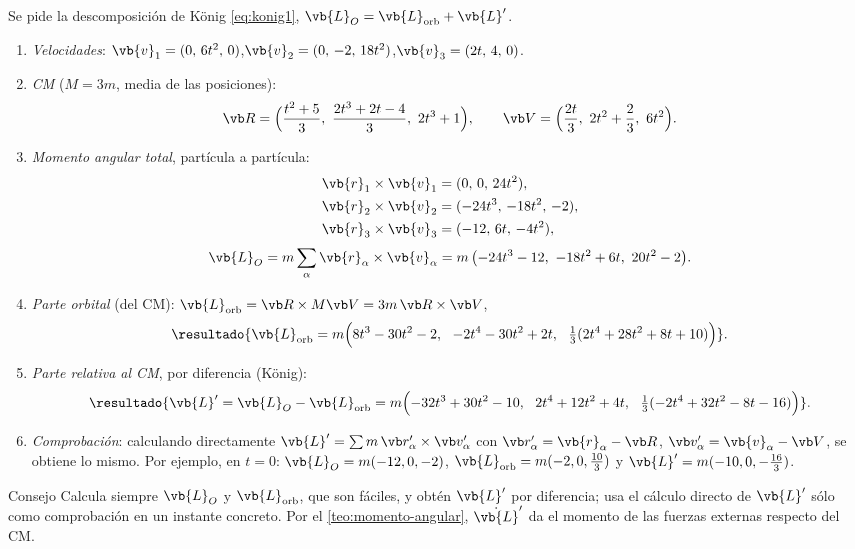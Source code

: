 \begin{resolucion}
Se pide la descomposición de König \eqref{eq:konig1},
$\vb{L}_{O}=\vb{L}_{\text{orb}}+\vb{L}'$.
\begin{enumerate}
  \item \emph{Velocidades}:
  $\vb{v}_{1}=(0,\,6t^{2},\,0)$,\quad $\vb{v}_{2}=(0,\,-2,\,18t^{2})$,\quad $\vb{v}_{3}=(2t,\,4,\,0)$.
  \item \emph{CM} ($M=3m$, media de las posiciones):
  \[
    \Rc=\Bigl(\frac{t^{2}+5}{3},\ \frac{2t^{3}+2t-4}{3},\ 2t^{3}+1\Bigr),\qquad
    \Vc=\Bigl(\frac{2t}{3},\ 2t^{2}+\frac23,\ 6t^{2}\Bigr).
  \]
  \item \emph{Momento angular total}, partícula a partícula:
  \begin{align*}
    \vb{r}_{1}\times\vb{v}_{1}&=(0,\,0,\,24t^{2}),\\
    \vb{r}_{2}\times\vb{v}_{2}&=(-24t^{3},\,-18t^{2},\,-2),\\
    \vb{r}_{3}\times\vb{v}_{3}&=(-12,\,6t,\,-4t^{2}),
  \end{align*}
  \[
    \vb{L}_{O}=m\sum_{\alpha}\vb{r}_{\alpha}\times\vb{v}_{\alpha}
    =m\,\bigl(-24t^{3}-12,\ -18t^{2}+6t,\ 20t^{2}-2\bigr).
  \]
  \item \emph{Parte orbital} (del CM): $\vb{L}_{\text{orb}}=\Rc\times M\Vc=3m\,\Rc\times\Vc$,
  \[
    \resultado{\vb{L}_{\text{orb}}=m\Bigl(8t^{3}-30t^{2}-2,\ \ -2t^{4}-30t^{2}+2t,\ \ \tfrac13(2t^{4}+28t^{2}+8t+10)\Bigr)} .
  \]
  \item \emph{Parte relativa al CM}, por diferencia (König):
  \[
    \resultado{\vb{L}'=\vb{L}_{O}-\vb{L}_{\text{orb}}
    =m\Bigl(-32t^{3}+30t^{2}-10,\ \ 2t^{4}+12t^{2}+4t,\ \ \tfrac13(-2t^{4}+32t^{2}-8t-16)\Bigr)} .
  \]
  \item \emph{Comprobación}: calculando directamente
  $\vb{L}'=\sum m\,\rp_{\alpha}\times\vp_{\alpha}$ con $\rp_{\alpha}=\vb{r}_{\alpha}-\Rc$,
  $\vp_{\alpha}=\vb{v}_{\alpha}-\Vc$, se obtiene lo mismo. Por ejemplo, en $t=0$:
  $\vb{L}_{O}=m(-12,0,-2)$, $\vb{L}_{\text{orb}}=m(-2,0,\tfrac{10}{3})$ y $\vb{L}'=m(-10,0,-\tfrac{16}{3})$.\qedhere
\end{enumerate}
\end{resolucion}

\begin{clave}[violeta]{Consejo}
Calcula siempre $\vb{L}_{O}$ y $\vb{L}_{\text{orb}}$, que son fáciles, y obtén $\vb{L}'$ por
diferencia; usa el cálculo directo de $\vb{L}'$ sólo como comprobación en un
instante concreto. Por el \cref{teo:momento-angular}, $\dot{\vb{L}}'$ da el momento de
las fuerzas externas respecto del CM.
\end{clave}

